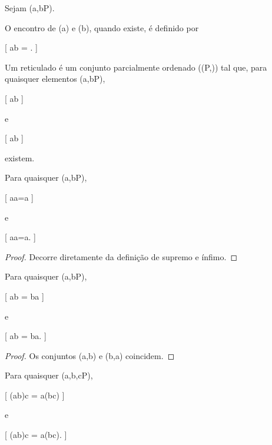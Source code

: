 \documentclass[../../main]{subfiles}
\begin{document}
\begin{defn}[Encontro]
	\label{def:matematica:relacoes:reticulados:encontro}

	Sejam (a,b\in P).

	O encontro de (a) e (b), quando existe, é definido por

		[
			a\wedge b
			=
			.
		]

\end{defn}

\begin{defn}[Reticulado]
	\label{def:matematica:relacoes:reticulados:reticulado}

	Um reticulado é um conjunto parcialmente ordenado
	((P,\le)) tal que, para quaisquer elementos
	(a,b\in P),

	[
			a\vee b
		]

	e

		[
			a\wedge b
		]

	existem.

\end{defn}

\begin{prop}[Idempotência]

	Para quaisquer (a,b\in P),

	[
			a\vee a=a
		]

	e

		[
			a\wedge a=a.
		]

\end{prop}

\begin{proof}

	Decorre diretamente da definição de supremo e ínfimo.

\end{proof}

\begin{prop}[Comutatividade]

	Para quaisquer (a,b\in P),

	[
			a\vee b
			=
			b\vee a
		]

	e

		[
			a\wedge b
			=
			b\wedge a.
		]

\end{prop}

\begin{proof}

	Os conjuntos ({a,b}) e ({b,a}) coincidem.

\end{proof}

\begin{prop}[Associatividade]

	Para quaisquer (a,b,c\in P),

	[
			(a\vee b)\vee c
			=
			a\vee(b\vee c)
		]

	e

		[
			(a\wedge b)\wedge c
			=
			a\wedge(b\wedge c).
		]

\end{prop}
\end{document}

